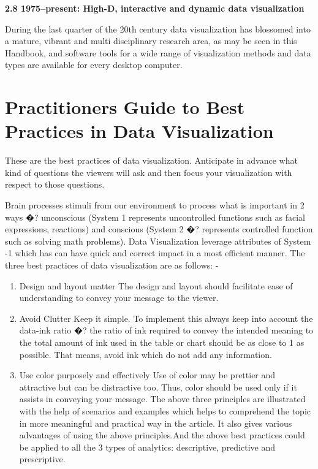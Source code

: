 \documentclass[]{book}
\providecommand{\tightlist}{%
  \setlength{\itemsep}{0pt}\setlength{\parskip}{0pt}}
\theoremstyle{definition}
\theoremstyle{definition}
\theoremstyle{definition}
\theoremstyle{remark}
\begin{document}
\textbf{2.8 1975--present: High-D, interactive and dynamic data
visualization}

During the last quarter of the 20th century data visualization has
blossomed into a mature, vibrant and multi disciplinary research area,
as may be seen in this Handbook, and software tools for a wide range of
visualization methods and data types are available for every desktop
computer.

\section{\texorpdfstring{\textbf{Practitioners Guide to Best Practices
in Data
Visualization}}{Practitioners Guide to Best Practices in Data Visualization}}\label{practitioners-guide-to-best-practices-in-data-visualization}

\citep{best-practice}

These are the best practices of data visualization. Anticipate in
advance what kind of questions the viewers will ask and then focus your
visualization with respect to those questions.

Brain processes stimuli from our environment to process what is
important in 2 ways �? unconscious (System 1 represents uncontrolled
functions such as facial expressions, reactions) and conscious (System 2
�? represents controlled function such as solving math problems). Data
Visualization leverage attributes of System -1 which has can have quick
and correct impact in a most efficient manner. The three best practices
of data visualization are as follows: -

\begin{enumerate}
\def\labelenumi{\arabic{enumi}.}
\tightlist
\item
  Design and layout matter The design and layout should facilitate ease
  of understanding to convey your message to the viewer.
\item
  Avoid Clutter Keep it simple. To implement this always keep into
  account the data-ink ratio �? the ratio of ink required to convey the
  intended meaning to the total amount of ink used in the table or chart
  should be as close to 1 as possible. That means, avoid ink which do
  not add any information.
\item
  Use color purposely and effectively Use of color may be prettier and
  attractive but can be distractive too. Thus, color should be used only
  if it assists in conveying your message. The above three principles
  are illustrated with the help of scenarios and examples which helps to
  comprehend the topic in more meaningful and practical way in the
  article. It also gives various advantages of using the above
  principles.And the above best practices could be applied to all the 3
  types of analytics: descriptive, predictive and prescriptive.
\end{enumerate}
\end{document}
